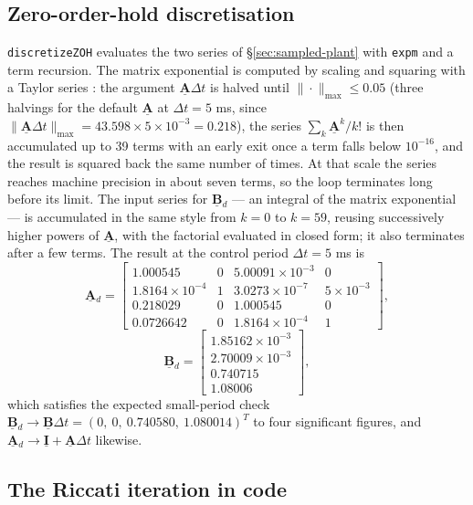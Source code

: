 \documentclass[12pt]{article}
\newcommand{\mb}[1]{\underline{\mathbf{#1}}}
\begin{document}
\subsection{Zero-order-hold discretisation}
\label{sec:zoh-discretisation}

\texttt{discretizeZOH} evaluates the two series of \S\ref{sec:sampled-plant} with \texttt{expm} and a term recursion. The matrix exponential is computed by scaling and squaring with a Taylor series \cite{MolerVanLoan2003,Higham2005}: the argument $\mb{A}\Delta t$ is halved until $\|\cdot\|_{\max} \le 0.05$ (three halvings for the default $\mb{A}$ at $\Delta t = 5$ ms, since $\|\mb{A}\Delta t\|_{\max} = 43.598 \times 5\times10^{-3} = 0.218$), the series $\sum_k \mb{A}^k/k!$ is then accumulated up to 39 terms with an early exit once a term falls below $10^{-16}$, and the result is squared back the same number of times. At that scale the series reaches machine precision in about seven terms, so the loop terminates long before its limit. The input series for $\mb{B}{}_d$ --- an integral of the matrix exponential \cite{VanLoan1978} --- is accumulated in the same style from $k=0$ to $k=59$, reusing successively higher powers of $\mb{A}$, with the factorial evaluated in closed form; it also terminates after a few terms. The result at the control period $\Delta t = 5$ ms is
{\small
\[
\mb{A}{}_d = \begin{bmatrix} 1.000545 & 0 & 5.00091\times10^{-3} & 0 \\ 1.8164\times10^{-4} & 1 & 3.0273\times10^{-7} & 5\times10^{-3} \\ 0.218029 & 0 & 1.000545 & 0 \\ 0.0726642 & 0 & 1.8164\times10^{-4} & 1 \end{bmatrix},
\]
\[
\mb{B}{}_d = \begin{bmatrix} 1.85162\times10^{-3} \\ 2.70009\times10^{-3} \\ 0.740715 \\ 1.08006 \end{bmatrix},
\]
}
which satisfies the expected small-period check $\mb{B}{}_d \to \mb{B}\Delta t = (0,\ 0,\ 0.740580,\ 1.080014)^T$ to four significant figures, and $\mb{A}{}_d \to \mb{I} + \mb{A}\Delta t$ likewise.

\subsection{The Riccati iteration in code}
\label{sec:riccati-code}
\end{document}
